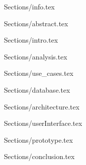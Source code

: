 \documentclass[12pt]{article}
\begin{document}
 {Sections/info.tex}
\maketitle

 {Sections/abstract.tex}

\tableofcontents

\newpage

 {Sections/intro.tex}

 {Sections/analysis.tex}

 {Sections/use_cases.tex}

 {Sections/database.tex}

 {Sections/architecture.tex}

 {Sections/userInterface.tex}

 {Sections/prototype.tex}

 {Sections/conclusion.tex}
\end{document}
